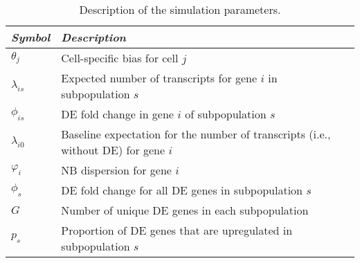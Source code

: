 \documentclass{bmcart}
\begin{document}
\begin{backmatter}
\begin{table}[!h]
\caption{
    Description of the simulation parameters.
}
\begin{center}
\begin{tabular}{l l}
    \hline
\textit{Symbol} & \textit{Description} \\   
    \hline
    $\theta_j$ &  Cell-specific bias for cell $j$ \\
    $\lambda_{is}$ & Expected number of transcripts for gene $i$ in subpopulation $s$ \\
    $\phi_{is}$ & DE fold change in gene $i$ of subpopulation $s$ \\
    $\lambda_{i0}$ & Baseline expectation for the number of transcripts (i.e., without DE) for gene $i$ \\
    $\varphi_i$ & NB dispersion for gene $i$ \\
    $\phi_{s}$ & DE fold change for all DE genes in subpopulation $s$ \\
    $G$ & Number of unique DE genes in each subpopulation \\
    $p_s$ & Proportion of DE genes that are upregulated in subpopulation $s$ \\
    \hline
\end{tabular}
\end{center}
\label{tab:sim_param}
\end{table}


\end{backmatter}
\end{document}
